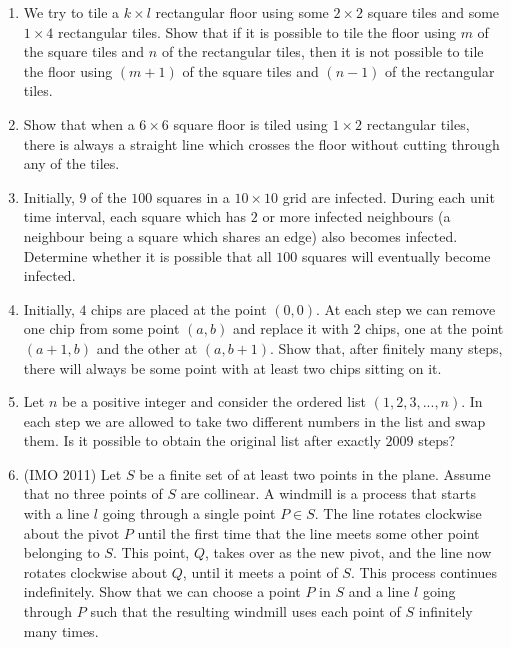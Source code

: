 \documentclass[11pt]{scrartcl}
\begin{document}
\begin{enumerate}
\item We try to tile a $k \times l$ rectangular floor using some $2 \times 2$ square tiles and some $1 \times 4$ rectangular tiles. Show that if it is possible to tile the floor using $m$ of the square tiles and $n$ of the rectangular tiles, then it is not possible to tile the floor using $(m + 1)$ of the square tiles and $(n - 1)$ of the rectangular tiles.

\item Show that when a $6 \times 6$ square floor is tiled using $1 \times 2$ rectangular tiles, there is always a straight line which crosses the floor without cutting through any of the tiles.

\item Initially, $9$ of the $100$ squares in a $10 \times 10$ grid are infected. During each unit time interval, each square which has $2$ or more infected neighbours (a neighbour being a square which shares an edge) also becomes infected. Determine whether it is possible that all $100$ squares will eventually become infected.

\item Initially, $4$ chips are placed at the point $(0, 0)$. At each step we can remove one chip from some point $(a, b)$ and replace it with $2$ chips, one at the point $(a + 1, b)$ and the other at $(a, b + 1)$. Show that, after finitely many steps, there will always be some point with at least two chips sitting on it.



\item Let $n$ be a positive integer and consider the ordered list $(1, 2, 3,...,n)$. In each step we are allowed to take two different numbers in the list and swap them. Is it possible to obtain the original list after exactly $2009$ steps?

\item (IMO 2011) Let $S$ be a finite set of at least two points in the plane. Assume that no three points of $S$ are collinear. A windmill is a process that starts with a line $l$ going through a single point $P \in S$. The line rotates clockwise about the pivot $P$ until the first time that the line meets some other point belonging to $S$. This point, $Q$, takes over as the new pivot, and the line now rotates clockwise about $Q$, until it meets a point of $S$. This process continues indefinitely. Show that we can choose a point $P$ in $S$ and a line $l$ going through $P$ such that the resulting windmill uses each point of $S$ infinitely many times.


\end{enumerate}
\end{document}
